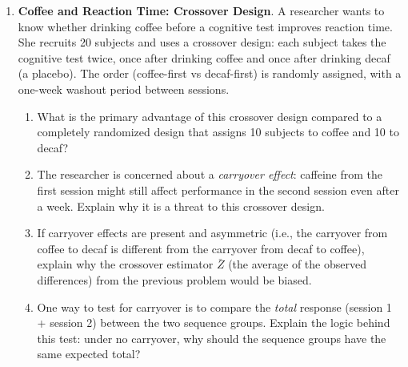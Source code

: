 \documentclass[
  letterpaper,
  DIV=11,
  numbers=noendperiod]{scrartcl}
\providecommand{\tightlist}{%
  \setlength{\itemsep}{0pt}\setlength{\parskip}{0pt}}
\begin{document}
\begin{enumerate}
\def\labelenumi{\arabic{enumi}.}
\setcounter{enumi}{1}
\item
  \textbf{Coffee and Reaction Time: Crossover Design}. A researcher
  wants to know whether drinking coffee before a cognitive test improves
  reaction time. She recruits 20 subjects and uses a crossover design:
  each subject takes the cognitive test twice, once after drinking
  coffee and once after drinking decaf (a placebo). The order
  (coffee-first vs decaf-first) is randomly assigned, with a one-week
  washout period between sessions.

  \begin{enumerate}
  \def\labelenumii{\alph{enumii}.}
  \tightlist
  \item
    What is the primary advantage of this crossover design compared to a
    completely randomized design that assigns 10 subjects to coffee and
    10 to decaf?
  \item
    The researcher is concerned about a \emph{carryover effect}:
    caffeine from the first session might still affect performance in
    the second session even after a week. Explain why it is a threat to
    this crossover design.
  \item
    If carryover effects are present and asymmetric (i.e., the carryover
    from coffee to decaf is different from the carryover from decaf to
    coffee), explain why the crossover estimator \(\bar{Z}\) (the
    average of the observed differences) from the previous problem would
    be biased.
  \item
    One way to test for carryover is to compare the \emph{total}
    response (session 1 + session 2) between the two sequence groups.
    Explain the logic behind this test: under no carryover, why should
    the sequence groups have the same expected total?
  \end{enumerate}
\end{enumerate}
\end{document}
